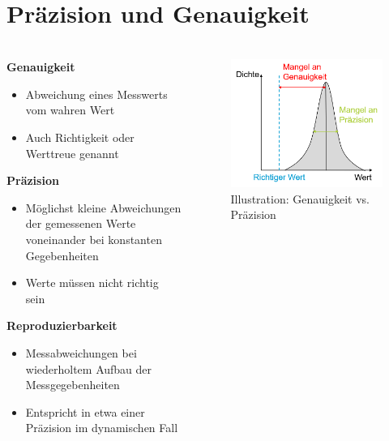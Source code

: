 \section{Präzision und Genauigkeit}

\begin{frame}
    \frametitle{\insertsection}
    \begin{columns}[c, onlytextwidth]
        \begin{column}{0.6\textwidth}
            \textbf{Genauigkeit}
            \begin{itemize}
                \item Abweichung eines Messwerts vom wahren Wert
                \item Auch Richtigkeit oder Werttreue genannt
            \end{itemize}
            \textbf{Präzision}
            \begin{itemize}
                \item Möglichst kleine Abweichungen der gemessenen Werte voneinander bei konstanten Gegebenheiten
                \item Werte müssen nicht richtig sein
            \end{itemize}
            \textbf{Reproduzierbarkeit}
            \begin{itemize}
                \item Messabweichungen bei wiederholtem Aufbau der Messgegebenheiten
                \item Entspricht in etwa einer Präzision im dynamischen Fall
            \end{itemize}
        \end{column}
        \begin{column}{0.4\textwidth}
            \begin{figure}
                \includegraphics[width=\columnwidth]{fig/slides_messtechnik1_ws21_18}
                \caption{Illustration: Genauigkeit vs. Präzision}
            \end{figure}
        \end{column}
        \end{columns}
\end{frame}


